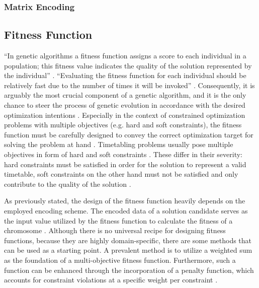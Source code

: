 \documentclass[sigconf]{acmart}
\begin{document}
\subsubsection{Matrix Encoding}


\subsection{Fitness Function}
\enquote{In genetic algorithms a fitness function assigns a score to each
individual in a population; this fitness value indicates the quality of the
solution represented by the individual} \cite{Affenzeller2009}.
\enquote{Evaluating the fitness function for each individual should be
relatively fast due to the number of times it will be invoked}
\cite{Affenzeller2009}.
Consequently, it is arguably the most crucial component of a genetic algorithm,
and it is the only chance to steer the process of genetic evolution in
accordance with the desired optimization intentions
\cite{Beligiannis2009,kinnear1994perspective}.
Especially in the context of constrained optimization problems with multiple
objectives (e.g. hard and soft constraints), the fitness function must be
carefully designed to convey the correct optimization target for solving the
problem at hand \cite{Beligiannis2009,Carr2014}.
Timetabling problems usually pose multiple objectives in form of hard and
soft constraints \cite{Beligiannis2009}. These differ in their severity:
hard constraints must be satisfied in order for the solution to represent a
valid timetable, soft constraints on the other hand must not be satisfied and
only contribute to the quality of the solution \cite{Beligiannis2009}.

As previously stated, the design of the fitness function heavily depends on the
employed encoding scheme. The encoded data of a solution candidate serves as
the input value utilized by the fitness function to calculate the fitness of a
chromosome \cite{Affenzeller2009}. Although there is no universal recipe for
designing fitness functions, because they are highly domain-specific,
there are some methods that can be used as a starting point.
A prevalent method is to utilize a weighted sum as the foundation of a
multi-objective fitness function. Furthermore, such a function can be enhanced
through the incorporation of a penalty function, which accounts for constraint
violations at a specific weight per constraint \cite{Beligiannis2009}.

\end{document}
